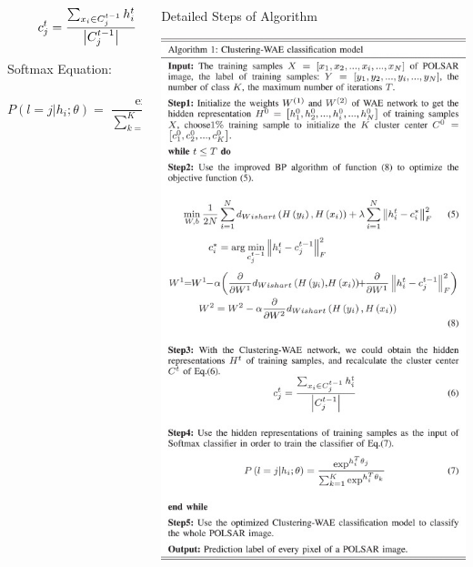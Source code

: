 \documentclass[10pt]{beamer}
\begin{document}
\begin{frame}
\begin{columns}
\begin{column}{0.5\textwidth}
\begin{equation} \label{eq:six}
\hphantom {\min \limits _{W,b}~}c_{j}^{t} = \frac {{\sum \nolimits _{x_{i} \in C_{j}^{t - 1}} {h_{i}^{t}} }}{{\left |{ {C_{j}^{t - 1}} }\right |}}
\end{equation}

Softmax Equation:

\begin{equation} \label{eq:seven}
P\left ({ {l = j|{h_{i}};\theta } }\right ) = \frac {{{\exp ^{h_{i}^{T}{\theta _{j}}}}}}{{\sum \nolimits _{k = 1}^{K} {{\exp ^{h_{i}^{T}{\theta _{k}}}}} }}
\end{equation}
\end{column}
\begin{column}{0.5\textwidth}
\begin{table}
  \caption{Detailed Steps of Algorithm}
  \label{tab:one}
  \includegraphics[width=\linewidth]{table_1.jpg}
\end{table}
\end{column}
\end{columns}
\end{frame}
\end{document}
